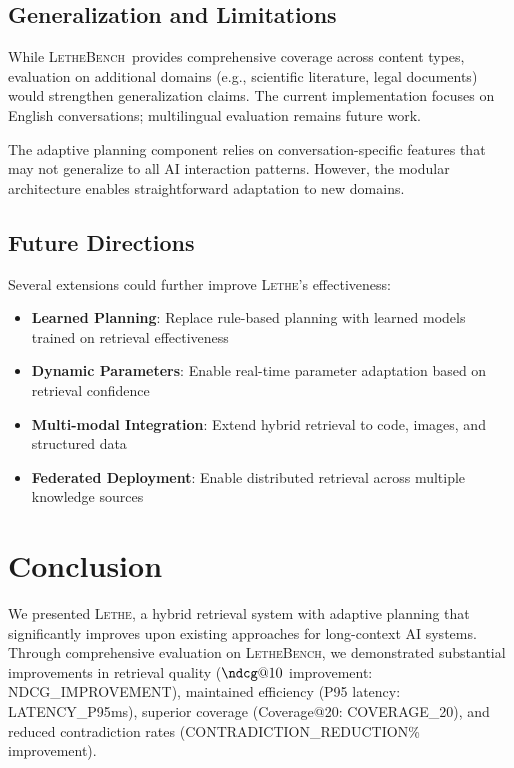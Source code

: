 \documentclass[letterpaper]{article}
\newcommand{\lethe}{\textsc{Lethe}}
\newcommand{\lethebench}{\textsc{LetheBench}}
\begin{document}
\subsection{Generalization and Limitations}

While \lethebench\ provides comprehensive coverage across content types, evaluation on additional domains (e.g., scientific literature, legal documents) would strengthen generalization claims. The current implementation focuses on English conversations; multilingual evaluation remains future work.

The adaptive planning component relies on conversation-specific features that may not generalize to all AI interaction patterns. However, the modular architecture enables straightforward adaptation to new domains.

\subsection{Future Directions}

Several extensions could further improve \lethe's effectiveness:

\begin{itemize}
    \item \textbf{Learned Planning}: Replace rule-based planning with learned models trained on retrieval effectiveness
    \item \textbf{Dynamic Parameters}: Enable real-time parameter adaptation based on retrieval confidence
    \item \textbf{Multi-modal Integration}: Extend hybrid retrieval to code, images, and structured data
    \item \textbf{Federated Deployment}: Enable distributed retrieval across multiple knowledge sources
\end{itemize}

\section{Conclusion}

We presented \lethe, a hybrid retrieval system with adaptive planning that significantly improves upon existing approaches for long-context AI systems. Through comprehensive evaluation on \lethebench, we demonstrated substantial improvements in retrieval quality ($\ndcg@10$ improvement: {{NDCG_IMPROVEMENT}}), maintained efficiency (P95 latency: {{LATENCY_P95}}ms), superior coverage (Coverage@20: {{COVERAGE_20}}), and reduced contradiction rates ({{CONTRADICTION_REDUCTION}}\% improvement).
\end{document}

